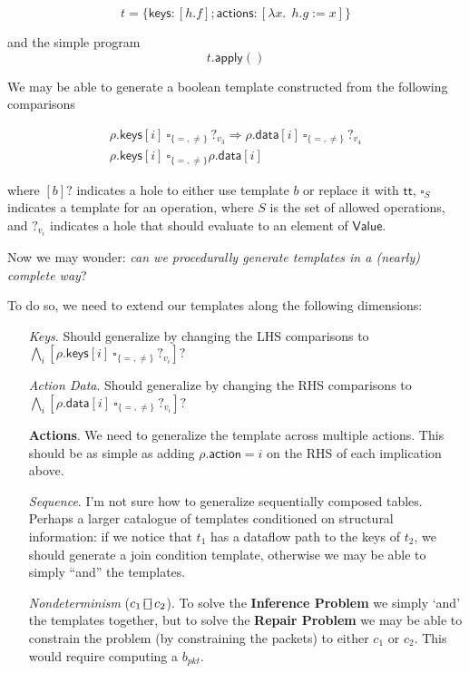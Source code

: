 \documentclass{article}
\newcommand{\TRUE}{\mathsf{tt}}
\newcommand{\Value}{\mathsf{Value}}
\newcommand{\action}{\mathsf{action}}
\newcommand{\actions}{\mathsf{actions}}
\newcommand{\keys}{\mathsf{keys}}
\newcommand{\data}{\mathsf{data}}
\newcommand{\apply}{\mathsf{apply}}
\newcommand{\choiceop}{\rotatebox[origin=c]{90}{$\sqsubset\!\!\!\sqsupset$}}
\newcommand{\choice}{\mathbin{\choiceop}}
\begin{document}
\[t = \{\keys: [h.f]; \actions: [\lambda x.~~h.g:= x]\}\]

and the simple program \[t.\apply()\]

We may be able to generate a boolean template constructed from the following
comparisons

\[
\begin{array}{l}
  \rho.\keys[i]~\square_{\{=,\neq\}}~?_{v_3} \Rightarrow \rho.\data[i]~\square_{\{=,\neq\}}~?_{v_4} \\

  \rho.\keys[i]~\square_{\{=,\neq\}}\rho.\data[i]
\end{array}\]

where $[b]?$ indicates a hole to either use template $b$ or replace it with
$\TRUE$, $\square_S$ indicates a template for an operation, where $S$ is the set
of allowed operations, and $?_{v_i}$ indicates a hole that should evaluate to an element
of $\Value$.



Now we may wonder: \emph{can we procedurally generate templates in a (nearly) complete way}?

To do so, we need to extend our templates along the following dimensions:
\begin{enumerate}[align=left]
\item[\textit{Keys}.] Should generalize by changing the LHS comparisons to $
  \bigwedge_i[\rho.\keys[i]~\square_{\{=,\neq\}}~?_{v_i}]?$
\item[\textit{Action Data}.] Should generalize by changing the RHS comparisons to $\bigwedge_i[\rho.\data[i]~\square_{\{=,\neq\}}~?_{v_i}]?$
\item[\textbf{Actions}.] We need to generalize the template across multiple actions. This should be as simple as adding $\rho.\action = i$ on the RHS of each implication above.
\item[\textit{Sequence}.] I'm not sure how to generalize sequentially composed tables.
  Perhaps a larger catalogue of templates conditioned on structural information:
  if we notice that $t_1$ has a dataflow path to the keys of $t_2$, we should
  generate a join condition template, otherwise we may be able to simply ``and'' the templates.

\item[\textit{Nondeterminism} ($c_1 \choice c_2$).] To solve the
  \textbf{Inference Problem} we simply `and' the templates together, but to solve
  the \textbf{Repair Problem} we may be able to constrain the problem (by
  constraining the packets) to either $c_1$ or $c_2$. This would require
  computing a $b_{\textit{pkt}}$.
\end{enumerate}
\end{document}
